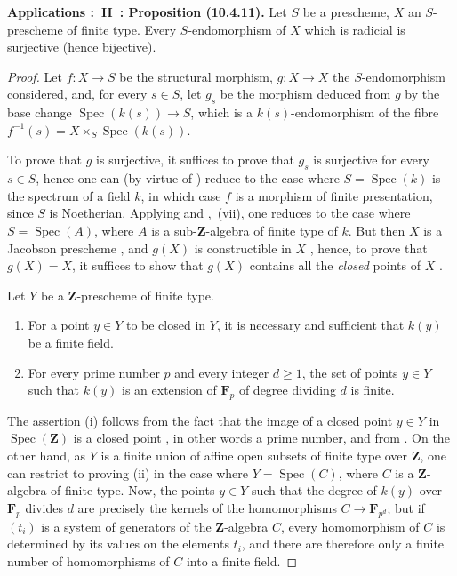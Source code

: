 \begin{env}[10.4.11]
\label{IV.10.4.11}
\textbf{Applications :~II~: Proposition (10.4.11).}
Let $S$ be a prescheme, $X$ an $S$-prescheme of finite type.
Every $S$-endomorphism of $X$ which is radicial is surjective (hence bijective).
\end{env}

\begin{proof}
Let $f:X\to S$ be the structural morphism, $g:X\to X$ the $S$-endomorphism considered, and, for every $s\in S$, let $g_s$ be the morphism deduced from $g$ by the base change $\operatorname{Spec}(k(s))\to S$, which is a $k(s)$-endomorphism of the fibre $f^{-1}(s)=X\times_S\operatorname{Spec}(k(s))$.

To prove that $g$ is surjective, it suffices to prove that $g_s$ is surjective for every $s\in S$, hence one can (by virtue of ) reduce to the case where $S=\operatorname{Spec}(k)$ is the spectrum of a field $k$, in which case $f$ is a morphism of finite presentation, since $S$ is Noetherian.
Applying  and ,~(vii), one reduces to the case where $S=\operatorname{Spec}(A)$, where $A$ is a sub-$\mathbf{Z}$-algebra of finite type of $k$.
But then $X$ is a Jacobson prescheme , and $g(X)$ is constructible in $X$ , hence, to prove that $g(X)=X$, it suffices to show that $g(X)$ contains all the \emph{closed} points of $X$ .

\begin{lemma}[10.4.11.1]
\label{IV.10.4.11.1}
Let $Y$ be a $\mathbf{Z}$-prescheme of finite type.
\begin{enumerate}[label=(\roman*)]
  \item For a point $y\in Y$ to be closed in $Y$, it is necessary and sufficient that $k(y)$ be a finite field.
  \item For every prime number $p$ and every integer $d\geq 1$, the set of points $y\in Y$ such that $k(y)$ is an extension of $\mathbf{F}_p$ of degree dividing $d$ is finite.
\end{enumerate}
\end{lemma}

The assertion (i) follows from the fact that the image of a closed point $y\in Y$ in $\operatorname{Spec}(\mathbf{Z})$ is a closed point , in other words a prime number, and from .
On the other hand, as $Y$ is a finite union of affine open subsets of finite type over $\mathbf{Z}$, one can restrict to proving (ii) in the case where $Y=\operatorname{Spec}(C)$, where $C$ is a $\mathbf{Z}$-algebra of finite type.
Now, the points $y\in Y$ such that the degree of $k(y)$ over $\mathbf{F}_p$ divides $d$ are precisely the kernels of the homomorphisms $C\to\mathbf{F}_{p^d}$; but if $(t_i)$ is a system of generators of the $\mathbf{Z}$-algebra $C$, every homomorphism of $C$ is determined by its values on the elements $t_i$, and there are therefore only a finite number of homomorphisms of $C$ into a finite field.


\end{proof}

